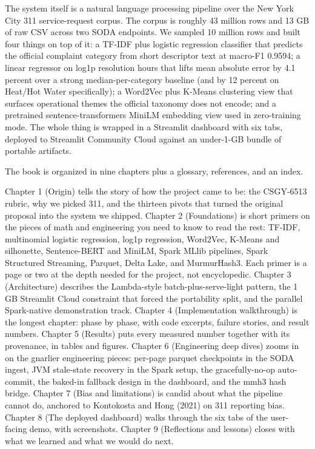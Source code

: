 \documentclass[11pt,letterpaper]{book}
\begin{document}
The system itself is a natural language processing pipeline over the New York City 311 service-request corpus. The corpus is roughly 43 million rows and 13 GB of raw CSV across two SODA endpoints. We sampled 10 million rows and built four things on top of it: a TF-IDF plus logistic regression classifier that predicts the official complaint category from short descriptor text at macro-F1 0.9594; a linear regressor on log1p resolution hours that lifts mean absolute error by 4.1 percent over a strong median-per-category baseline (and by 12 percent on Heat/Hot Water specifically); a Word2Vec plus K-Means clustering view that surfaces operational themes the official taxonomy does not encode; and a pretrained sentence-transformers MiniLM embedding view used in zero-training mode. The whole thing is wrapped in a Streamlit dashboard with six tabs, deployed to Streamlit Community Cloud against an under-1-GB bundle of portable artifacts.

The book is organized in nine chapters plus a glossary, references, and an index.

Chapter 1 (Origin) tells the story of how the project came to be: the CSGY-6513 rubric, why we picked 311, and the thirteen pivots that turned the original proposal into the system we shipped. Chapter 2 (Foundations) is short primers on the pieces of math and engineering you need to know to read the rest: TF-IDF, multinomial logistic regression, log1p regression, Word2Vec, K-Means and silhouette, Sentence-BERT and MiniLM, Spark MLlib pipelines, Spark Structured Streaming, Parquet, Delta Lake, and MurmurHash3. Each primer is a page or two at the depth needed for the project, not encyclopedic. Chapter 3 (Architecture) describes the Lambda-style batch-plus-serve-light pattern, the 1 GB Streamlit Cloud constraint that forced the portability split, and the parallel Spark-native demonstration track. Chapter 4 (Implementation walkthrough) is the longest chapter: phase by phase, with code excerpts, failure stories, and result numbers. Chapter 5 (Results) puts every measured number together with its provenance, in tables and figures. Chapter 6 (Engineering deep dives) zooms in on the gnarlier engineering pieces: per-page parquet checkpoints in the SODA ingest, JVM stale-state recovery in the Spark setup, the gracefully-no-op auto-commit, the baked-in fallback design in the dashboard, and the mmh3 hash bridge. Chapter 7 (Bias and limitations) is candid about what the pipeline cannot do, anchored to Kontokosta and Hong (2021) on 311 reporting bias. Chapter 8 (The deployed dashboard) walks through the six tabs of the user-facing demo, with screenshots. Chapter 9 (Reflections and lessons) closes with what we learned and what we would do next.
\end{document}
